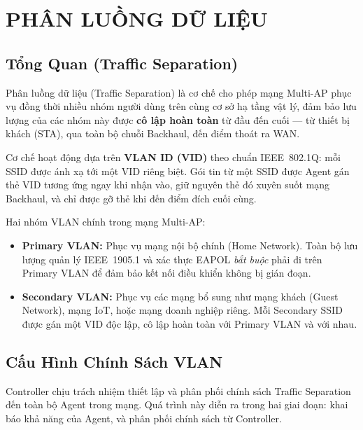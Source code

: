 \chapter{PHÂN LUỒNG DỮ LIỆU}
\label{chapter:chapter-10}

\section{Tổng Quan (Traffic Separation)}

Phân luồng dữ liệu (Traffic Separation) là cơ chế cho phép mạng Multi-AP phục vụ
đồng thời nhiều nhóm người dùng trên cùng cơ sở hạ tầng vật lý, đảm bảo lưu lượng
của các nhóm này được \textbf{cô lập hoàn toàn} từ đầu đến cuối --- từ thiết bị khách
(STA), qua toàn bộ chuỗi Backhaul, đến điểm thoát ra WAN.

Cơ chế hoạt động dựa trên \textbf{VLAN ID (VID)} theo chuẩn IEEE~802.1Q: mỗi SSID
được ánh xạ tới một VID riêng biệt. Gói tin từ một SSID được Agent gán thẻ VID tương
ứng ngay khi nhận vào, giữ nguyên thẻ đó xuyên suốt mạng Backhaul, và chỉ được gỡ
thẻ khi đến điểm đích cuối cùng.

Hai nhóm VLAN chính trong mạng Multi-AP:
\begin{itemize}
	\item \textbf{Primary VLAN:} Phục vụ mạng nội bộ chính (Home Network). Toàn bộ
	lưu lượng quản lý IEEE~1905.1 và xác thực EAPOL \textit{bắt buộc} phải đi
	trên Primary VLAN để đảm bảo kết nối điều khiển không bị gián đoạn.
	\item \textbf{Secondary VLAN:} Phục vụ các mạng bổ sung như mạng khách (Guest
	Network), mạng IoT, hoặc mạng doanh nghiệp riêng. Mỗi Secondary SSID được
	gán một VID độc lập, cô lập hoàn toàn với Primary VLAN và với nhau.
\end{itemize}


\section{Cấu Hình Chính Sách VLAN}

Controller chịu trách nhiệm thiết lập và phân phối chính sách Traffic Separation đến
toàn bộ Agent trong mạng. Quá trình này diễn ra trong hai giai đoạn: khai báo
khả năng của Agent, và phân phối chính sách từ Controller.


